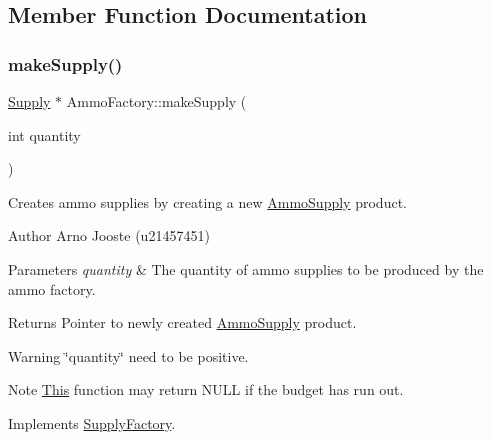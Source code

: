 \subsection{Member Function Documentation}
\mbox{\label{class_ammo_factory_a8d2b1cb24f145547af1de2d051f0e02c}} 
\subsubsection{\texorpdfstring{makeSupply()}{makeSupply()}}
{\footnotesize\ttfamily \mbox{\hyperlink{class_supply}{Supply}} $\ast$ Ammo\+Factory\+::make\+Supply (\begin{DoxyParamCaption}\item[{int}]{quantity }\end{DoxyParamCaption})\hspace{0.3cm}{\ttfamily [virtual]}}



Creates ammo supplies by creating a new \mbox{\hyperlink{class_ammo_supply}{Ammo\+Supply}} product. 

\begin{DoxyAuthor}{Author}
Arno Jooste (u21457451) 
\end{DoxyAuthor}

\begin{DoxyParams}{Parameters}
{\em quantity} & The quantity of ammo supplies to be produced by the ammo factory. \\
\hline
\end{DoxyParams}
\begin{DoxyReturn}{Returns}
Pointer to newly created \mbox{\hyperlink{class_ammo_supply}{Ammo\+Supply}} product. 
\end{DoxyReturn}
\begin{DoxyWarning}{Warning}
\char`\"{}quantity\char`\"{} need to be positive. 
\end{DoxyWarning}
\begin{DoxyNote}{Note}
\mbox{\hyperlink{class_this}{This}} function may return N\+U\+LL if the budget has run out. 
\end{DoxyNote}


Implements \mbox{\hyperlink{class_supply_factory_a110ff7418c656661e935a33e49300722}{Supply\+Factory}}.

